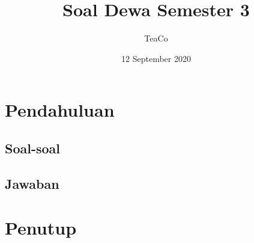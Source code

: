 \documentclass{article}
\title{Soal Dewa Semester 3}
\author{TeaCo}
\date{12 September 2020}
\begin{document}
\maketitle

\section{Pendahuluan}
\subsection{Soal-soal}

\subsection{Jawaban}
\section{Penutup}
\end{document}
